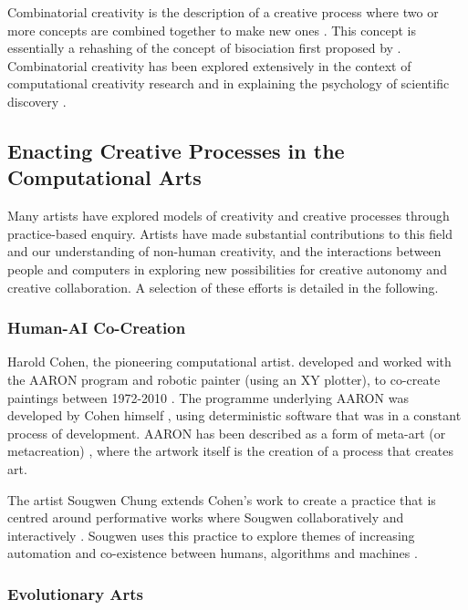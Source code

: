 Combinatorial creativity is the description of a creative process where two or more concepts are combined together to make new ones \citep{boden2004creative}. 
This concept is essentially a rehashing of the concept of bisociation first proposed by \cite{koestler1964act}. 
Combinatorial creativity has been explored extensively in the context of computational creativity research \citep{zarraonandia2017using, guzdial2018combinets, guzdial2018combinatorial} and in explaining the psychology of scientific discovery \citep{simonton2021scientific, simonton2022serendipity}.

\subsection{Enacting Creative Processes in the Computational Arts}

Many artists have explored models of creativity and creative processes through practice-based enquiry.
Artists have made substantial contributions to this field and our understanding of non-human creativity, and the interactions between people and computers in exploring new possibilities for creative autonomy and creative collaboration.
A selection of these efforts is detailed in the following.

\subsubsection{Human-AI Co-Creation}

Harold Cohen, the pioneering computational artist. developed and worked with the AARON program and robotic painter (using an XY plotter), to co-create paintings between 1972-2010 \citep{cohen2016harold}. 
The programme underlying AARON was developed by Cohen himself \citep{cohen1995further}, using deterministic software that was in a constant process of development. 
AARON has been described as a form of meta-art (or metacreation) \citep{mccorduck1991aaron}, where the artwork itself is the creation of a process that creates art.

The artist Sougwen Chung extends Cohen's work to create a practice that is centred around performative works where Sougwen collaboratively and interactively \citep{benediktsson2019human}.
Sougwen uses this practice to explore themes of increasing automation and co-existence between humans, algorithms and machines \citep{voss2021conversation}.

\subsubsection{Evolutionary Arts}

